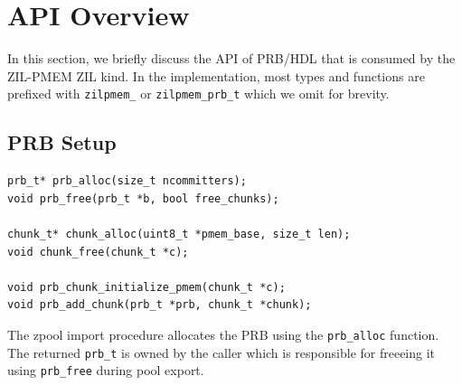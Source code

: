 \documentclass[12pt,a4paper,twoside]{book}
\begin{document}


\section{API Overview}\label{di:prb:api}
In this section, we briefly discuss the API of PRB/HDL that is consumed by the ZIL-PMEM ZIL kind.
In the implementation, most types and functions are prefixed with \lstinline{zilpmem_} or \lstinline{zilpmem_prb_t} which we omit for brevity.

\subsection{PRB Setup}
\begin{lstlisting}
prb_t* prb_alloc(size_t ncommitters);
void prb_free(prb_t *b, bool free_chunks);

chunk_t* chunk_alloc(uint8_t *pmem_base, size_t len);
void chunk_free(chunk_t *c);

void prb_chunk_initialize_pmem(chunk_t *c);
void prb_add_chunk(prb_t *prb, chunk_t *chunk);
\end{lstlisting}

The zpool import procedure allocates the PRB using the \lstinline{prb_alloc} function.
The returned \lstinline{prb_t} is owned by the caller which is responsible for freeeing it using \lstinline{prb_free} during pool export.
\end{document}
